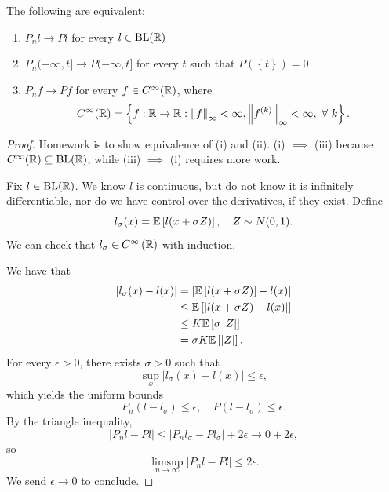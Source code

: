 \begin{theorem}
	The following are equivalent:
	\begin{enumerate}[label=(\roman*)]
		\item $P_n l \to Pl$ for every $l \in \operatorname{BL}(\mathbb{R})$
		\item $P_n(-\infty,t] \to P(-\infty,t]$ for every $t$ such that $P(\left\{t\right\}) = 0$
		\item $P_n f \to Pf$ for every $f \in C^{\infty}(\mathbb{R})$, where \[
				C^{\infty}(\mathbb{R}) = \left\{f: \mathbb{R} \to \mathbb{R} : \left\|f\right\|_{\infty} < \infty, \left\|f^{(k)}\right\|_\infty < \infty,\ \forall\ k\right\}
		.\] 
	\end{enumerate}
\end{theorem}

\begin{proof}
	Homework is to show equivalence of (i) and (ii). (i) $\implies $ (iii) because $C^{\infty}(\mathbb{R}) \subseteq \operatorname{BL}(\mathbb{R})$, while (iii) $\implies$ (i) requires more work.

	Fix $l \in \operatorname{BL}(\mathbb{R})$. We know $l$ is continuous, but do not know it is infinitely differentiable, nor do we have control over the derivatives, if they exist. Define \[
		l_\sigma(x) = \mathbb{E}\left[l(x+\sigma Z)\right], \quad Z \sim N(0,1)
	.\] We can check that $l_\sigma \in C^\infty\left( \mathbb{R} \right)$ with induction. 

	We have that
	\begin{align*}
		\left| l_\sigma(x) - l(x) \right|
		&= \left| \mathbb{E}\left[l(x+\sigma Z)\right] - l(x) \right| \\
		&\le \mathbb{E}\left[\left| l(x+\sigma Z) - l(x)\right|\right] \\ 
		&\le K \mathbb{E}\left[\sigma \left| Z \right|\right] \\
		&= \sigma K \mathbb{E}\left[\left| Z \right|\right]
	.\end{align*}
	For every $\epsilon > 0$, there exists $\sigma > 0$ such that \[
		\sup_x \left| l_\sigma(x) - l(x) \right|\le \epsilon
	,\] which yields the uniform bounds \[
		P_n\left( l-l_\sigma \right) \le \epsilon, \quad P\left( l-l_\sigma \right) \le \epsilon
	.\] By the triangle inequality, \[
		\left| P_n l - Pl \right| \le \left| P_n l_\sigma - P l_\sigma \right| + 2\epsilon \to 0 + 2\epsilon
	,\] so \[
		\limsup\limits_{n \to \infty} \left| P_n l - Pl \right| \le 2\epsilon
	.\] We send $\epsilon \to 0$ to conclude.
\end{proof}

